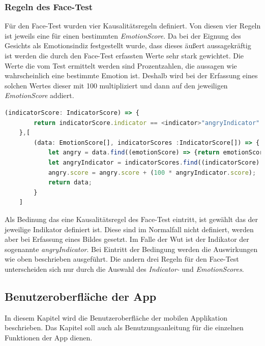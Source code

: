 \subsubsection{Regeln des Face-Test}
Für den Face-Test wurden vier Kausalitätsregeln definiert. Von diesen vier Regeln ist jeweils eine für einen bestimmten \textit{EmotionScore}. Da bei der Eignung des Gesichts als Emotionsindiz festgestellt wurde, dass dieses äußert aussagekräftig ist werden die durch den Face-Test erfassten Werte sehr stark gewichtet. Die Werte die vom Test ermittelt werden sind Prozentzahlen, die aussagen wie wahrscheinlich eine bestimmte Emotion ist. Deshalb wird bei der Erfassung eines solchen Wertes dieser mit 100 multipliziert und dann auf den jeweiligen \textit{EmotionScore} addiert. \newline
\begin{lstlisting}[caption={Kausalitätsregel basierend auf Face-Test für Emotion Wut}, language=JavaScript]
	(indicatorScore: IndicatorScore) => {
		return indicatorScore.indicator == <indicator>"angryIndicator" && indicatorScore.score != undefined;    
	},[
		(data: EmotionScore[], indicatorScores :IndicatorScore[]) => {
			let angry = data.find((emotionScore) => {return emotionScore.emotion == <emotion>"angry"});
			let angryIndicator = indicatorScores.find((indicatorScore) => {return indicatorScore.indicator == <indicator>"angryIndicator"});
			angry.score = angry.score + (100 * angryIndicator.score);
			return data;
		}
	]
\end{lstlisting}
Als Bedinung das eine Kausalitätsregel des Face-Test eintritt, ist gewählt das der jeweilige Indikator definiert ist. Diese sind im Normalfall nicht definiert, werden aber bei Erfassung eines Bildes gesetzt. Im Falle der Wut ist der Indikator der sogenannte \textit{angryIndicator}. Bei Eintritt der Bedingung werden die Auswirkungen wie oben beschrieben ausgeführt. Die andern drei Regeln für den Face-Test unterscheiden sich nur durch die Auswahl des \textit{Indicator-} und \textit{EmotionScores}.
\subsection{Benutzeroberfläche der App}
In diesem Kapitel wird die Benutzeroberfläche der mobilen Applikation beschrieben. Das Kapitel soll auch als Benutzungsanleitung für die einzelnen Funktionen der App dienen.

